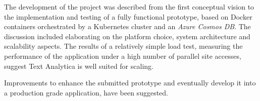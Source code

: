 \documentclass[conference]{IEEEtran}
\begin{document}
The development of the project was described from the first conceptual vision to the implementation and testing of a fully functional prototype, based on Docker containers orchestrated by a Kubernetes cluster and an \textit{Azure Cosmos DB}. The discussion included elaborating on the platform choice, system architecture and scalability aspects. The results of a relatively simple load test, measuring the performance of the application under a high number of parallel site accesses, suggest Text Analytica is well suited for scaling.

Improvements to enhance the submitted prototype and eventually develop it into a production grade application, have been suggested.



\end{document}
